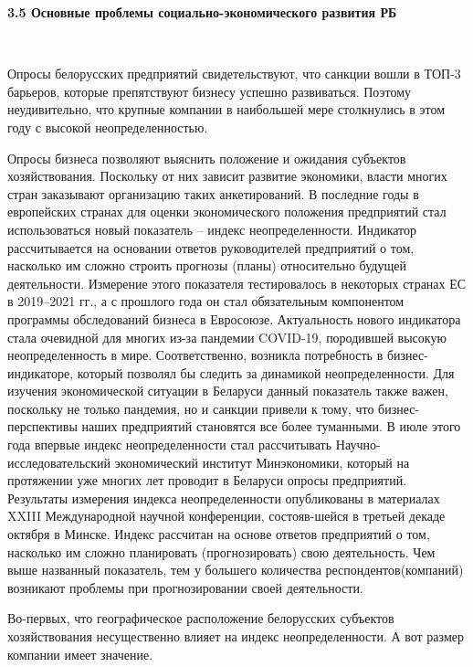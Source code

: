 \documentclass[14pt,a4paper]{article}
\begin{document}
    \newpage
    \begin{center}
        \textbf{3.5 Основные проблемы социально-экономического развития РБ}
    \end{center}
    \\
    \par
    Опросы белорусских предприятий свидетельствуют, что санкции вошли в ТОП-3 барьеров, которые препятствуют бизнесу успешно развиваться.
    Поэтому неудивительно, что крупные компании в наибольшей мере столкнулись в этом году с высокой неопределенностью.
    \par
    Опросы бизнеса позволяют выяснить положение и ожидания субъектов хозяйствования.
    Поскольку от них зависит развитие экономики, власти многих стран заказывают организацию таких анкетирований.
    В последние годы в европейских странах для оценки экономического положения предприятий стал использоваться новый показатель – индекс неопределенности.
    Индикатор рассчитывается на основании ответов руководителей предприятий о том, насколько им сложно строить прогнозы (планы) относительно будущей деятельности.
    Измерение этого показателя тестировалось в некоторых странах ЕС в 2019–2021 гг., а с прошлого года он стал обязательным компонентом программы обследований бизнеса в Евросоюзе.
    Актуальность нового индикатора стала очевидной для многих из-за пандемии COVID-19, породившей высокую неопределенность в мире.
    Соответственно, возникла потребность в бизнес-индикаторе, который позволял бы следить за динамикой неопределенности.
    Для изучения экономической ситуации в Беларуси данный показатель также важен, поскольку не только пандемия, но и санкции привели к тому, что бизнес-перспективы наших предприятий становятся все более туманными.
    В июле этого года впервые индекс неопределенности стал рассчитывать Научно-исследовательский экономический институт Минэкономики, который на протяжении уже многих лет проводит в Беларуси опросы предприятий.
    Результаты измерения индекса неопределенности опубликованы в материалах XXIII Международной научной конференции, состояв-шейся в третьей декаде октября в Минске.
    Индекс рассчитан на основе ответов предприятий о том, насколько им сложно планировать (прогнозировать) свою деятельность.
    Чем выше названный показатель, тем у большего количества респондентов(компаний) возникают проблемы при прогнозировании своей деятельности.
    \par
    Во-первых, что географическое расположение белорусских субъектов хозяйствования несущественно влияет на индекс неопределенности.
    А вот размер компании имеет значение.
\end{document}
